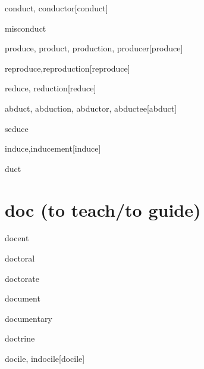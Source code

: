 \begin{RefWord}{conduct, conductor}[conduct]
\end{RefWord}

\begin{RefWord}{misconduct}
\end{RefWord}

\begin{RefWord}{produce, product, production, producer}[produce]
\end{RefWord}

\begin{RefWord}{reproduce,reproduction}[reproduce]
\end{RefWord}

\begin{RefWord}{reduce, reduction}[reduce]
\end{RefWord}

\begin{RefWord}{abduct, abduction, abductor, abductee}[abduct]
\end{RefWord}

\begin{RefWord}{seduce}
\end{RefWord}

\begin{RefWord}{induce,inducement}[induce]
\end{RefWord}

\begin{RefWord}{duct}
\end{RefWord}

\section{doc (to teach/to guide)}

\begin{RefWord}{docent}
\end{RefWord}

\begin{RefWord}{doctoral}
\end{RefWord}

\begin{RefWord}{doctorate}
\end{RefWord}


\begin{RefWord}{document}
\end{RefWord}

\begin{RefWord}{documentary}
\end{RefWord}

\begin{RefWord}{doctrine}
\end{RefWord}

\begin{RefWord}{docile, indocile}[docile]
\end{RefWord}